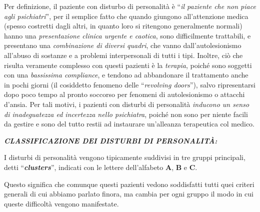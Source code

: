 \documentclass[]{article}
\begin{document}
Per definizione, il paziente con disturbo di personalità è ``\emph{il
paziente che non piace agli psichiatri}'', per il semplice fatto che
quando giungono all'attenzione medica (spesso costretti dagli altri, in
quanto loro si ritengono generalmente normali) hanno una
\emph{presentazione clinica urgente e caotica}, sono difficilmente
trattabili, e presentano una \emph{combinazione di diversi quadri}, che
vanno dall'autolesionismo all'abuso di sostanze e a problemi
interpersonali di tutti i tipi. Inoltre, ciò che risulta veramente
complesso con questi pazienti è la \emph{terapia}, poiché sono soggetti
con una \emph{bassissima compliance}, e tendono ad abbandonare il
trattamento anche in pochi giorni (il cosiddetto fenomeno delle
``\emph{revolving doors}''), salvo ripresentarsi dopo poco tempo al
pronto soccorso per fenomeni di autolesionismo o attacchi d'ansia. Per
tali motivi, i pazienti con disturbi di personalità \emph{inducono un
senso di inadeguatezza ed incertezza nello psichiatra}, poiché non sono
per niente facili da gestire e sono del tutto restii ad instaurare
un'alleanza terapeutica col medico.

\textbf{\emph{CLASSIFICAZIONE DEI DISTURBI DI PERSONALITÀ:}}

I disturbi di personalità vengono tipicamente suddivisi in tre gruppi
principali, detti ``\textbf{\emph{clusters}}'', indicati con le lettere
dell'alfabeto \textbf{A}, \textbf{B} e \textbf{C}.

Questo significa che comunque questi pazienti vedono soddisfatti tutti
quei criteri generali di cui abbiamo parlato finora, ma cambia per ogni
gruppo il modo in cui queste difficoltà vengono manifestate.
\end{document}
